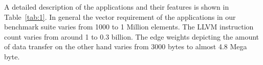 A detailed description of the applications and their features is shown
in Table~\ref{tab:1}. In general the vector requirement of the
applications in our benchmark suite varies from 1000 to 1 Million
elements. The LLVM instruction count varies from around 1 to 0.3
billion. The edge weights depicting the amount of data transfer on the
other hand varies from 3000 bytes to almost 4.8 Mega byte.

\begin{small}
  \begin{table}[h!]
    \centering
    \caption{The filter graph set-up}
    \label{tab:1}
  \end{table}
\end{small}

